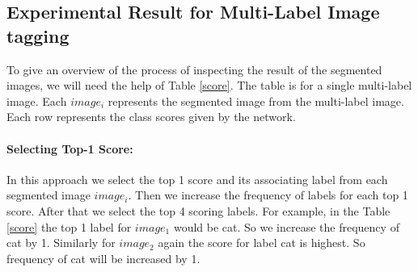 \subsection{Experimental Result for Multi-Label Image tagging}
To give an overview of the process of inspecting the result of the segmented images, we will need the help of Table \ref{score}. The table is for a single multi-label image. Each $image_{i}$ represents the segmented image from the multi-label image. Each row represents the class scores given by the network. 

\paragraph{Selecting Top-1 Score:}
In this approach we select the top 1 score and its associating label from each segmented image $image_{i}$. Then we increase the frequency of labels for each top 1 score. After that we select the top 4 scoring labels. For example, in the Table \ref{score} the top 1 label for $image_{1}$ would be cat. So we increase the frequency of cat by 1. Similarly for $image_{2}$ again the score for label cat is highest. So frequency of cat will be increased by 1.


